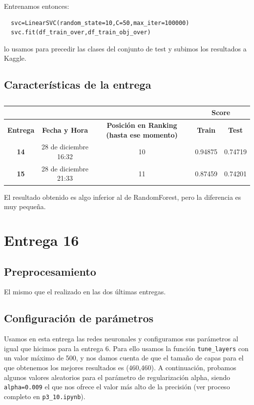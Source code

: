 \documentclass[a4paper,11pt]{article}
\begin{document}
  Entrenamos entonces:
  \begin{verbatim}
  svc=LinearSVC(random_state=10,C=50,max_iter=100000)
  svc.fit(df_train_over,df_train_obj_over)
  \end{verbatim}
  
  lo usamos para precedir las clases del conjunto de test y subimos los resultados a Kaggle. 
  
  \subsection{Características de la entrega}

	\begin{table}[htbp]
		\caption{}\begin{center}
		\begin{tabular}{|c|c|c|c|c|}
			\hline
			\multicolumn{1}{|l|}{\textbf{}} & \textbf{} & \textbf{} & \multicolumn{ 2}{c|}{\textbf{Score}} \\ \hline
			\textbf{Entrega} & \textbf{Fecha y Hora} & \textbf{Posición en Ranking (hasta ese momento)} & \textbf{Train} & \textbf{Test} \\ \hline
			\textbf{14} & 28 de diciembre 16:32  & 10 & 0.94875 & 0.74719 \\ \hline
			\textbf{15} & 28 de diciembre 21:33  & 11 & 0.87459 & 0.74201 \\ \hline
		\end{tabular}\end{center}
		\label{}
	\end{table}
	  
	 El resultado obtenido es algo inferior al de RandomForest, pero la diferencia es muy pequeña.
 \section{Entrega 16}
 \subsection{Preprocesamiento}
 El mismo que el realizado en las dos últimas entregas. 
 \subsection{Configuración de parámetros}
 
 Usamos en esta entrega las redes neuronales y configuramos sus parámetros al igual que hicimos para la entrega 6. Para ello usamos la función \texttt{tune_layers} con un valor máximo de 500, y nos damos cuenta de que el tamaño de capas para el que obtenemos los mejores resultados es (460,460). A continuación, probamos algunos valores aleatorios para el parámetro de regularización alpha, siendo \texttt{alpha=0.009} el que nos ofrece el valor más alto de la precisión (ver proceso completo en \texttt{p3_10.ipynb}).
 
\end{document}
